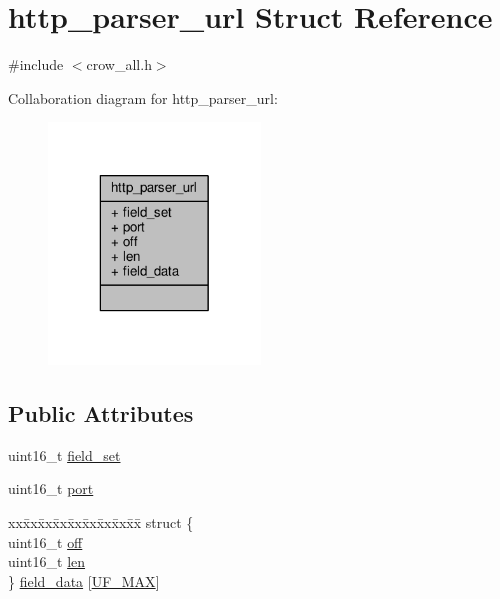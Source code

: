 \hypertarget{structhttp__parser__url}{\section{http\-\_\-parser\-\_\-url Struct Reference}
\label{structhttp__parser__url}
}


{\ttfamily \#include $<$crow\-\_\-all.\-h$>$}



Collaboration diagram for http\-\_\-parser\-\_\-url\-:
\nopagebreak
\begin{figure}[H]
\begin{center}
\leavevmode
\includegraphics[width=160pt]{structhttp__parser__url__coll__graph}
\end{center}
\end{figure}
\subsection*{Public Attributes}
\begin{DoxyCompactItemize}
\item 
uint16\-\_\-t \hyperlink{structhttp__parser__url_a77af61a480f11c41938810dd76ca49eb}{field\-\_\-set}
\item 
uint16\-\_\-t \hyperlink{structhttp__parser__url_a875fb8faf3ee45707078eda5435fa563}{port}
\item 
\begin{tabbing}
xx\=xx\=xx\=xx\=xx\=xx\=xx\=xx\=xx\=\kill
struct \{\\
\>uint16\_t \hyperlink{structhttp__parser__url_a6510826f3aa9a1100ac5f714323edeb1}{off}\\
\>uint16\_t \hyperlink{structhttp__parser__url_a60fb784a989dd5a95e5bd19d468d22c7}{len}\\
\} \hyperlink{structhttp__parser__url_a96a1fed71f3471692e9832f91b42f7db}{field\_data} \mbox{[}\hyperlink{crow__all_8h_a9ca1f91c2958091e2ac9e9b2f903d4eba4b40c88291e4fa018de04553e7e1adfd}{UF\_MAX}\mbox{]}\\

\end{tabbing}\end{DoxyCompactItemize}


